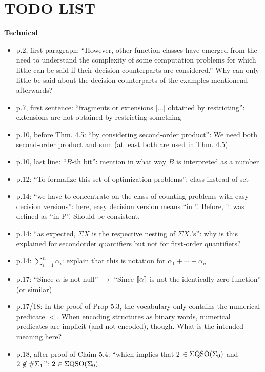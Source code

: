 
\section*{\LARGE \textbf{TODO LIST}}

\bigskip

{\bf Technical}

\begin{itemize}
	\setlength\itemsep{0.5em}
\item p.2, first paragraph: ``However, other function classes have emerged from the need to understand
the complexity of some computation problems for which little can be said if their
decision counterparts are considered.'' Why can only little be said about the decision counterparts
of the examples mentionend afterwards?
\item p.7, first sentence: ``fragments or extensions [...] obtained by restricting'': extensions are not
obtained by restricting something
\item p.10, before Thm. 4.5: ``by considering second-order product'': We need both second-order
product and sum (at least both are used in Thm. 4.5)
\item p.10, last line: ``$B$-th bit'': mention in what way $B$ is interpreted as a number
\item p.12: ``To formalize this set of optimization problems'': class instead of set
\item p.14: ``we have to concentrate on the class of counting problems with easy decision versions'':
here, easy decision version means ``in \bpp''. Before, it was defined as ``in P''. Should be
consistent.
\item p.14: ``as expected, $\Sigma \bar{X}$ is the respective nesting of $\Sigma X.$’s'': why is this explained for secondorder
quantifiers but not for first-order quantifiers?
\item p.14: $\sum_{i=1}^n\alpha_i$: explain that this is notation for $\alpha_1+\cdots+\alpha_n$
\item p.17: ``Since $\alpha$ is not null'' $\to$ ``Since ${\llbracket{}{\alpha}\rrbracket}$ is not the identically zero function'' (or similar)
\item p.17/18: In the proof of Prop 5.3, the vocabulary only contains the numerical predicate $<$. When encoding structures as binary words, numerical predicates are implicit (and not
encoded), though. What is the intended meaning here?
\item p.18, after proof of Claim 5.4: ``which implies that 2 $\in \Sigma{\rm QSO}(\Sigma_0)$ and $2 \not\in \#\Sigma_{1}$'': $2 \in \Sigma{\rm QSO}(\Sigma_0)$

\end{itemize}
